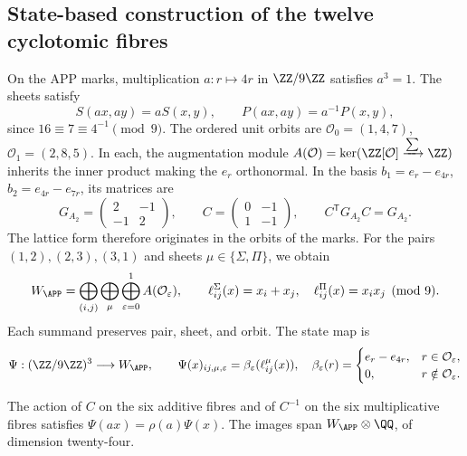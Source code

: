 \subsection{State-based construction of the twelve cyclotomic fibres}
\label{nuclear:fibras-app-witt}
On the APP marks, multiplication \(a:r\mapsto4r\) in
\(\ZZ/9\ZZ\) satisfies \(a^3=1\). The sheets satisfy
\[
 S(ax,ay)=aS(x,y),\qquad P(ax,ay)=a^{-1}P(x,y),
\]
since \(16\equiv7\equiv4^{-1}\pmod9\). The ordered unit orbits
are \(\mathcal O_0=(1,4,7)\), \(\mathcal O_1=(2,8,5)\).
In each, the augmentation module
\(A(\mathcal O)=\ker(\ZZ[\mathcal O]\xrightarrow{\sum}\ZZ)\)
inherits the inner product making the \(e_r\) orthonormal. In the basis
\(b_1=e_r-e_{4r}\), \(b_2=e_{4r}-e_{7r}\), its matrices are
\[
 G_{A_2}=\begin{pmatrix}2&-1\\-1&2\end{pmatrix},\qquad
 C=\begin{pmatrix}0&-1\\1&-1\end{pmatrix},\qquad
 C^{\mathsf T}G_{A_2}C=G_{A_2}.
\]
The lattice form therefore originates in the orbits of the marks.
For the pairs \((1,2),(2,3),(3,1)\) and sheets
\(\mu\in\{\Sigma,\Pi\}\), we obtain
\[
 W_{\APP}=\bigoplus_{(i,j)}\bigoplus_\mu\bigoplus_{\varepsilon=0}^1
 A(\mathcal O_\varepsilon),\qquad
 \ell^\Sigma_{ij}(x)=x_i+x_j,\quad
 \ell^\Pi_{ij}(x)=x_ix_j\pmod9.
\]
Each summand preserves pair, sheet, and orbit. The state map is
\[
 \Psi:(\ZZ/9\ZZ)^3\longrightarrow W_{\APP},\qquad
 \Psi(x)_{ij,\mu,\varepsilon}=\beta_\varepsilon(\ell^\mu_{ij}(x)),
 \quad
 \beta_\varepsilon(r)=
 \begin{cases}e_r-e_{4r},&r\in\mathcal O_\varepsilon,\\0,&r\notin\mathcal O_\varepsilon.
 \end{cases}
\]
\begin{proposition}
\label{nuclear:psi-rango}
The action of \(C\) on the six additive fibres and of \(C^{-1}\) on
the six multiplicative fibres satisfies \(\Psi(ax)=\rho(a)\Psi(x)\).
The images span \(W_{\APP}\otimes\QQ\), of dimension twenty-four.
\end{proposition}
